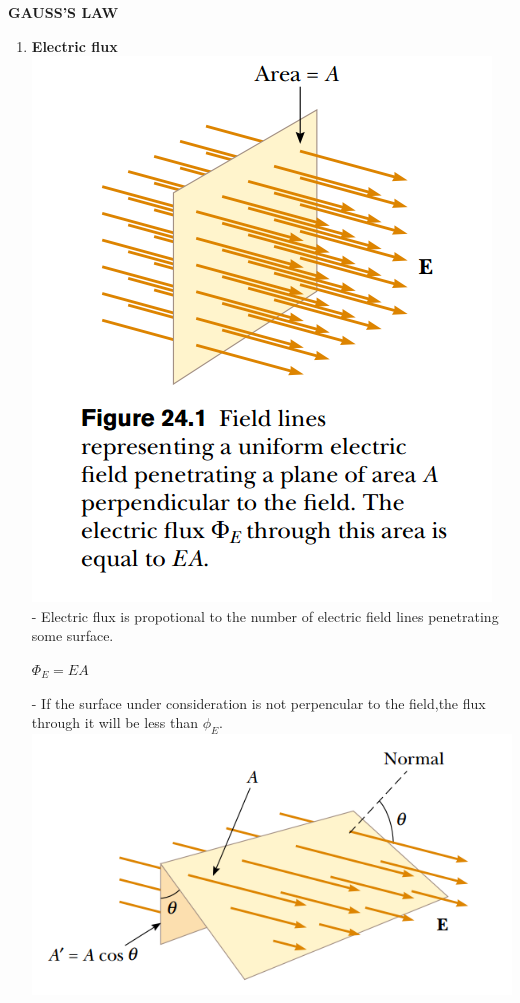 \documentclass[10pt]{article}
\begin{document}
\pagebreak
\begin{center}
\textbf{GAUSS'S LAW}
\end{center}
\begin{enumerate}
    \item \textbf{Electric flux}\\
    \includegraphics[scale = 0.7]{hinh7}\\
     - Electric flux is propotional to the number of electric field lines penetrating some surface.
     \begin{mybox}
     \begin{center}
     $\Phi_E = EA$
     \end{center}
     \end{mybox}
     - If the surface under consideration is not perpencular to the field,the flux through it will be less than $\phi_E$.\\
     \includegraphics{hinh8}

\end{enumerate}
\end{document}
